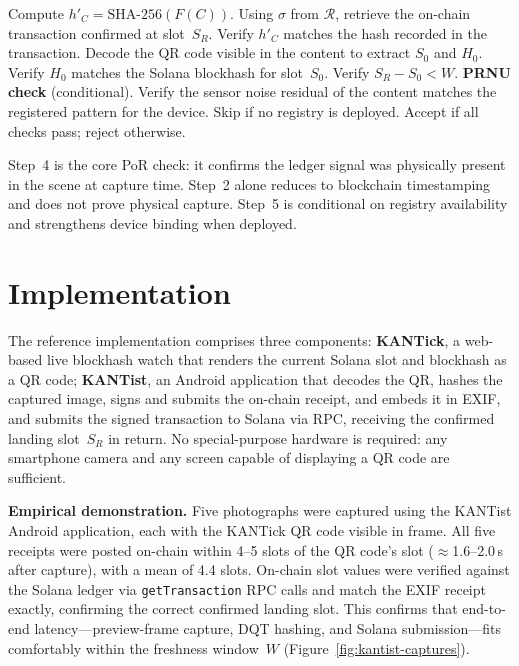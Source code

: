 \documentclass[11pt]{article}
\begin{document}
\begin{algorithm}[H]
\caption{PoR Verification}
\label{alg:verify-por}
\begin{algorithmic}[1]
  \State Compute $h'_C = \mathrm{SHA\text{-}256}(F(C))$.
  \State Using $\sigma$ from $\mathcal{R}$, retrieve the on-chain transaction
    confirmed at slot~$S_R$. Verify $h'_C$ matches the hash recorded in the
    transaction.
  \State Decode the QR code visible in the content to extract $S_0$ and $H_0$.
    Verify $H_0$ matches the Solana blockhash for slot~$S_0$.
  \State Verify $S_R - S_0 < W$.
  \State \textbf{PRNU check} (conditional). Verify the sensor noise residual
    of the content matches the registered pattern for the device. Skip if no
    registry is deployed.
  \State Accept if all checks pass; reject otherwise.
\end{algorithmic}
\end{algorithm}

Step~4 is the core PoR check: it confirms the ledger signal was physically
present in the scene at capture time. Step~2 alone reduces to blockchain
timestamping and does not prove physical capture. Step~5 is conditional on
registry availability and strengthens device binding when deployed.

\section{Implementation}
\label{sec:impl}

The reference implementation comprises three components: \textbf{KANTick},
a web-based live blockhash watch that renders the current Solana slot and
blockhash as a QR code; \textbf{KANTist}, an Android application that decodes
the QR, hashes the captured image, signs and submits the on-chain receipt, and
embeds it in EXIF, and submits the signed transaction to Solana via RPC,
receiving the confirmed landing slot~$S_R$ in return. No
special-purpose hardware is required: any smartphone camera and any screen
capable of displaying a QR code are sufficient.

\textbf{Empirical demonstration.} Five photographs were captured using the
KANTist Android application, each with the KANTick QR code visible in frame.
All five receipts were posted on-chain within 4--5 slots of the QR code's slot
($\approx$1.6--2.0\,s after capture), with a mean of 4.4 slots. On-chain slot
values were verified against the Solana ledger via \texttt{getTransaction} RPC
calls and match the EXIF receipt exactly, confirming the correct confirmed landing slot. This confirms that end-to-end
latency---preview-frame capture, DQT hashing, and Solana submission---fits
comfortably within the freshness window~$W$ (Figure~\ref{fig:kantist-captures}).
\end{document}
